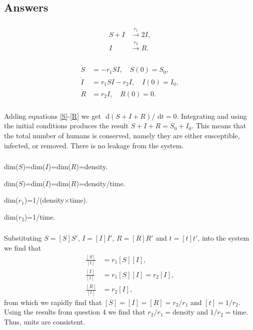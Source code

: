 \documentclass[]{article}
\newcommand{\rd}{\text{ d}}
\newcommand{\eqnto}[2]{equations \eqref{#1}-\eqref{#2}}
\renewcommand{\l}{\left(}
\renewcommand{\r}{\right)}
\begin{document}
\begin{Answ}
\subsection{Answers}
\subsubsection{}
\begin{align}
S+I&\stackrel{r_1}{\rightarrow}2I,\\
I&\stackrel{r_2}{\rightarrow}R.
\end{align}
\subsubsection{}
\begin{align}
\dot{S}&=-r_1SI,\quad S(0)=S_0,\label{S}\\
\dot{I}&=r_1SI-r_2I,\quad I(0)=I_0,\label{I}\\
\dot{R}&=r_2I,\quad R(0)=0.\label{R}
\end{align}
\subsubsection{}
Adding \eqnto{S}{R} we get $\rd \l S+I+R \r/\rd t=0$. Integrating and using the initial conditions produces the result $S+I+R=S_0+I_0$. This means that the total number of humans is conserved, namely they are either susceptible, infected, or removed. There is no leakage from the system.
\subsubsection{}
dim($S$)=dim($I$)=dim($R$)=density.

\noindent dim($\dot{S}$)=dim($\dot{I}$)=dim($\dot{R}$)=density/time.

\noindent dim($r_1$)=1/(density$\times$time).

\noindent dim($r_2$)=1/time.
\subsubsection{}
Substituting $S=[S]S'$, $I=[I]I'$, $R=[R]R'$ and $t=[t]t'$, into the system we find that
\begin{align}
\frac{[S]}{[t]}&=r_1[S][I],\\
\frac{[I]}{[t]}&=r_1[S][I]=r_2[I],\\
\frac{[R]}{[t]}&=r_2[I],
\end{align}
from which we rapidly find that $[S]=[I]=[R]=r_2/r_1$ and $[t]=1/r_2$. Using the results from question 4 we find that $r_2/r_1=$density and $1/r_2=$time. Thus, units are consistent.

\end{Answ}
\end{document}
